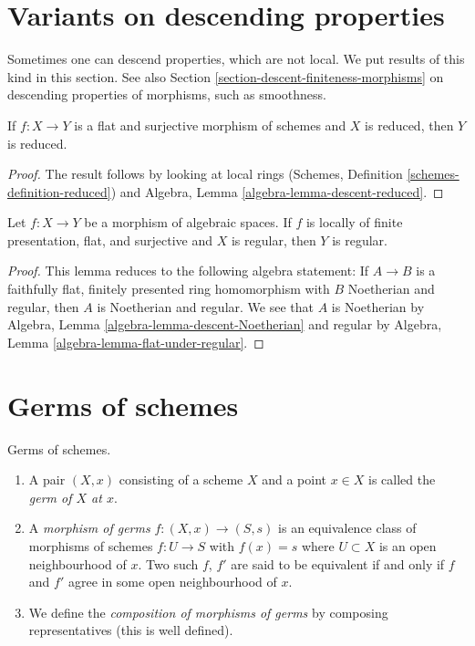 \section{Variants on descending properties}
\label{section-variants}

\noindent
Sometimes one can descend properties, which are not local.
We put results of this kind in this section. See also
Section \ref{section-descent-finiteness-morphisms}
on descending properties of morphisms,
such as smoothness.

\begin{lemma}
\label{lemma-descend-reduced}
If $f : X \to Y$ is a flat and surjective morphism of schemes
and $X$ is reduced, then $Y$ is reduced.
\end{lemma}

\begin{proof}
The result follows by looking at local rings
(Schemes, Definition \ref{schemes-definition-reduced})
and
Algebra, Lemma \ref{algebra-lemma-descent-reduced}.
\end{proof}

\begin{lemma}
\label{lemma-descend-regular}
Let $f : X \to Y$ be a morphism of algebraic spaces.
If $f$ is locally of finite presentation, flat, and surjective and
$X$ is regular, then $Y$ is regular.
\end{lemma}

\begin{proof}
This lemma reduces to the following algebra statement: If $A \to B$ is
a faithfully flat, finitely presented ring homomorphism with $B$ Noetherian
and regular, then $A$ is Noetherian and regular. We see that
$A$ is Noetherian by
Algebra, Lemma \ref{algebra-lemma-descent-Noetherian}
and regular by
Algebra, Lemma \ref{algebra-lemma-flat-under-regular}.
\end{proof}









\section{Germs of schemes}
\label{section-germs}

\begin{definition}
\label{definition-germs}
Germs of schemes.
\begin{enumerate}
\item A pair $(X, x)$ consisting of a scheme $X$ and a point $x \in X$ is
called the {\it germ of $X$ at $x$}.
\item A {\it morphism of germs} $f : (X, x) \to (S, s)$
is an equivalence class of morphisms of schemes $f : U \to S$ with $f(x) = s$
where $U \subset X$ is an open neighbourhood of $x$. Two such
$f$, $f'$ are said to be equivalent if and only if $f$ and $f'$
agree in some open neighbourhood of $x$.
\item We define the {\it composition of morphisms of germs}
by composing representatives (this is well defined).
\end{enumerate}
\end{definition}

